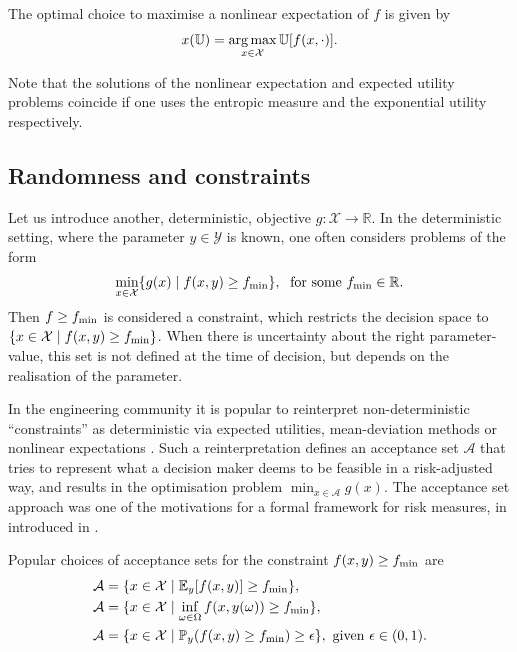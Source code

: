 \documentclass[main.tex]{subfiles}
\begin{document}
\begin{problem}
  The optimal choice to maximise a nonlinear expectation
  of $f$ is given by
  \begin{align}
    x(\mathbb U)=\operatorname*{arg\,max}_{x\in\mathcal{X}} \mathbb U[f(x,\cdot)].
  \end{align}
\end{problem}

Note that the solutions of the nonlinear expectation and expected
utility problems coincide if one uses the entropic measure and the exponential
utility respectively.

\subsection{Randomness and constraints}
Let us introduce another, deterministic, objective $g:\mathcal
X\to\mathbb R$. In the deterministic setting, where
the parameter $y\in\mathcal{Y}$ is known, one often considers problems
of the form
\begin{align}
  \min_{x\in\mathcal{X}}\{g(x)\mid f(x,y)\geq f_{\textnormal{min}} \},\;
  \text{ for some } f_{\textnormal{min}}\in\mathbb R.
\end{align}
Then $f\geq f_{\textnormal{min}}$ is considered a constraint, which restricts the
decision space to $\{x\in\mathcal{X}\mid f(x,y)\geq f_{\textnormal{min}}\}$.
When there is uncertainty about the right parameter-value, this set is
not defined at the time of decision, but depends on the realisation of
the parameter.

In the engineering community it is popular to
reinterpret non-deterministic ``constraints'' as deterministic via
expected utilities, mean-deviation methods or nonlinear
expectations
\citep{rockafellar2007coherent,rockafellar2015engineering}.
Such a reinterpretation defines an acceptance set $\mathcal{A}$ that
tries to represent what a decision maker deems to be feasible in a
risk-adjusted way, and results in the optimisation problem
$\min_{x\in\mathcal{A}} g(x)$.
The acceptance set approach was one of the motivations for a formal
framework for risk measures, in introduced in \citep{artzner1999coherent}.
\begin{example}
  Popular choices of acceptance sets for the constraint $f(x,y)\geq
  f_{\textnormal{min}}$ are
  \begin{align}
    \mathcal{A}&=\{x\in\mathcal X \mid
                 \mathbb E_y[f(x,y)]\geq f_{\textnormal{min}}\}, \\
    \mathcal{A}&=\{x\in\mathcal X \mid
                 \inf_{\omega\in\Omega}f(x,y(\omega))\geq f_{\textnormal{min}}\},\\
    \mathcal{A} &= \{x\in\mathcal X\mid
                  \mathbb P_y(f(x,y)\geq f_{\textnormal{min}})\geq \epsilon\},
                  \text{ given }\epsilon\in(0,1).
  \end{align}
\end{example}
\end{document}
